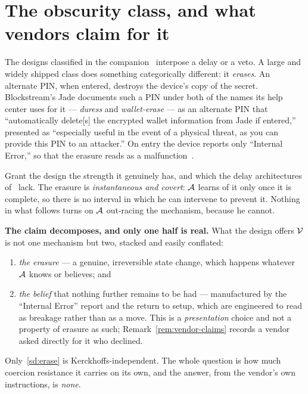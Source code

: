 \section{The obscurity class, and what vendors claim for it}
\label{sec:obscurity}


The designs classified in the companion~\cite[\S5]{deadly-race} interpose a delay or a
veto. A large and widely shipped class
does something categorically different: it \emph{erases}. An alternate PIN, when
entered, destroys the device's copy of the secret. Blockstream's Jade documents
such a PIN under both of the names its help center uses for it --- \emph{duress}
and \emph{wallet-erase} --- as an alternate PIN that ``automatically delete[s]
the encrypted wallet information from Jade if entered,'' presented as
``especially useful in the event of a physical threat, as you can provide this
PIN to an attacker.'' On entry the device reports only ``Internal Error,'' so
that the erasure reads as a
malfunction~\cite{jade-duress-pin,jade-erase-pin}.

Grant the design the strength it genuinely has, and which the delay
architectures of~\cite[\S5]{deadly-race} lack. The erasure is \emph{instantaneous and covert}:
$\mathcal{A}$ learns of it only once it is complete, so there is no interval in
which he can intervene to prevent it. Nothing in what follows turns on
$\mathcal{A}$ out-racing the mechanism, because he cannot.

\medskip\noindent\textbf{The claim decomposes, and only one half is real.} What
the design offers $\mathcal{V}$ is not one mechanism but two, stacked and easily
conflated:
\begin{enumerate}[nosep,leftmargin=2.4em,label=(\alph*),ref=\alph*]
  \item\label{sd:erase} \emph{the erasure} --- a genuine, irreversible state
        change, which happens whatever $\mathcal{A}$ knows or believes; and
  \item\label{sd:belief} \emph{the belief} that nothing further remains to be
        had --- manufactured by the ``Internal Error'' report and the return to
        setup, which are engineered to read as breakage rather than as a move.
        This is a \emph{presentation} choice and not a property of erasure as
        such; Remark~\ref{rem:vendor-claims} records a vendor asked directly for
        it who declined.
\end{enumerate}
Only~\ref{sd:erase} is Kerckhoffs-independent. The whole question is how much
coercion resistance it carries on its own, and the answer, from the vendor's own
instructions, is \emph{none}.

